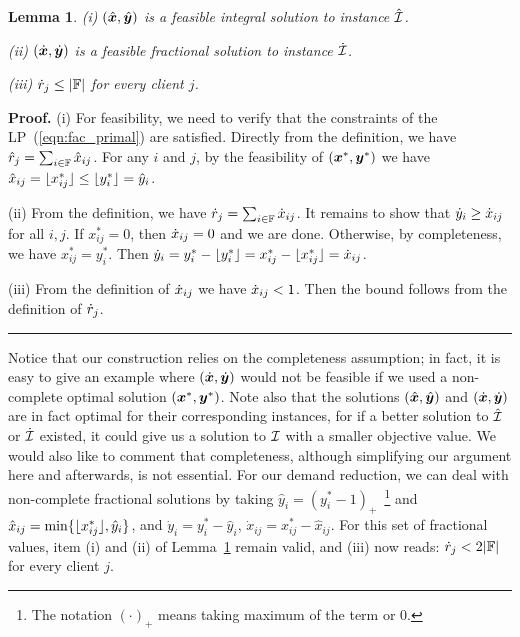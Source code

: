 \documentclass[oneside,final]{ucr}
\newtheorem{lemma}[theorem]{Lemma}
\newenvironment{proof}[1][Proof]{\textbf{#1.} }{\ \rule{0.5em}{0.5em}}
\begin{document}

\begin{lemma}\label{lem: polynomial demands partition}
{\rm (i)}
  $(\hat{\boldsymbol{x}}, \hat{\boldsymbol{y}})$ is a feasible integral solution to
  instance $\hatcalI$.

\noindent
{\rm (ii)}
  $(\dot{\boldsymbol{x}}, \dot{\boldsymbol{y}})$ is a feasible fractional
  solution to instance $\dotcalI$.

\noindent
{\rm (iii)}
${\dot r}_j\leq |\mathbb{F}|$ for every client $j$.

\end{lemma}
\begin{proof}
  (i) For feasibility, we need to verify that the
  constraints of the LP~(\ref{eqn:fac_primal}) are
  satisfied. Directly from the definition, we have ${\hat r}_j
  = \sum_{i\in\mathbb{F}} {\hat x}_{ij}$.  For any $i$ and $j$,
  by the feasibility of $(\boldsymbol{x}^\ast,\boldsymbol{y}^\ast)$ we have
  ${\hat x}_{ij} = { \lfloor x_{ij}^\ast \rfloor } \le { \lfloor y^\ast_i \rfloor } =
  {\hat y}_i$.

  (ii) From the definition, we have ${\dot r}_j =
  \sum_{i\in\mathbb{F}} {\dot x}_{ij}$.  It remains to show that
  ${\dot y}_i \geq {\dot x}_{ij}$ for all $i,j$.  If
  $x_{ij}^\ast=0$, then ${\dot x}_{ij}=0$ and we are done.
  Otherwise, by completeness, we have
  $x_{ij}^\ast=y_i^\ast$.  Then ${\dot y}_i = y_i^\ast -
  { \lfloor y_i^\ast \rfloor } = x_{ij}^\ast - { \lfloor x_{ij}^\ast \rfloor }
  ={\dot x}_{ij}$.

  (iii) From the definition of ${\dot x}_{ij}$ we have
  ${\dot x}_{ij} < 1$.  Then the bound follows from the
  definition of ${\dot r}_j$.
\end{proof}

Notice that our construction relies on the completeness
assumption; in fact, it is easy to give an example where
$(\dot{\boldsymbol{x}}, \dot{\boldsymbol{y}})$ would not be feasible if we used a
non-complete optimal solution $(\boldsymbol{x}^\ast,\boldsymbol{y}^\ast)$.  Note
also that the solutions $(\hat{\boldsymbol{x}},\hat{\boldsymbol{y}})$ and $(\dot{\boldsymbol{x}},
\dot{\boldsymbol{y}})$ are in fact optimal for their corresponding
instances, for if a better solution to $\hatcalI$ or
$\dotcalI$ existed, it could give us a solution to $\mathcal{I}$
with a smaller objective value. We would also like to
comment that completeness, although simplifying our argument
here and afterwards, is not essential. For our demand
reduction, we can deal with non-complete fractional
solutions by taking $\hat y_i = (y_i^\ast -
1)_+$~\footnote{The notation $(\cdot)_+$ means taking
  maximum of the term or 0.} and $\hat x_{ij} =
\min\{{ \lfloor x_{ij}^\ast \rfloor }, \hat y_i\}$, and $\dot y_i =
y_i^\ast - \hat y_i$, $\dot x_{ij} = x_{ij}^\ast - \hat
x_{ij}$. For this set of fractional values, item (i) and
(ii) of Lemma~\ref{lem: polynomial demands partition} remain
valid, and (iii) now reads: $\dot r_j < 2|\mathbb{F}|$ for
every client $j$.
\end{document}
